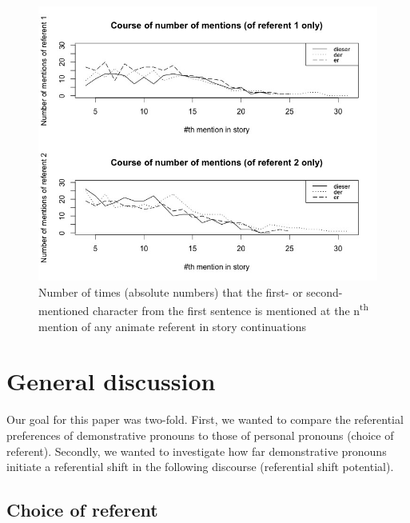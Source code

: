 \documentclass[output=paper,colorlinks,citecolor=brown]{langscibook}
\begin{document}
\begin{figure}
\includegraphics[width=\textwidth]{figures/a8FuchsSchumacher20200420-img003.jpg}
\caption{Number of times (absolute numbers) that the first- or second-mentioned character from the first sentence is mentioned at the n\textsuperscript{th} mention of any animate referent in story continuations}
\label{fig:fuchs:3}
\end{figure}

\section{General discussion}\label{sec:fuchs:3}

Our goal for this paper was two-fold. First, we wanted to compare the referential preferences of demonstrative pronouns to those of personal pronouns (choice of referent). Secondly, we wanted to investigate how far demonstrative pronouns initiate a referential shift in the following discourse (referential shift potential). 

\subsection{Choice of referent}\label{sec:fuchs:3.1}
\end{document}
